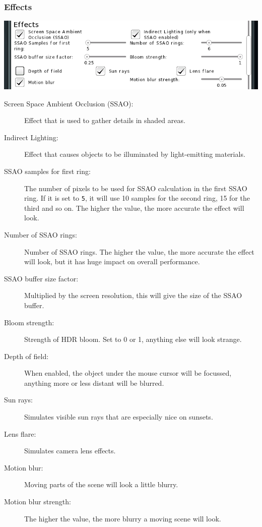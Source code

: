 \documentclass[a4paper]{article}
\newcommand{\cvalue}[1]{\texttt{#1}}
\begin{document}
\subsubsection{Effects}
\includegraphics[width=140mm]{./images/settings-effects.png}
\begin{description}
  \item[Screen Space Ambient Occlusion (SSAO):] Effect that is used to gather details in shaded areas.
  \item[Indirect Lighting:] Effect that causes objects to be illuminated by light-emitting materials.
  \item[SSAO samples for first ring:] The number of pixels to be used for SSAO calculation in the first SSAO ring. If it is set to \cvalue{5}, it will use 10 samples for the second ring, 15 for the third and so on. The higher the value, the more accurate the effect will look.
  \item[Number of SSAO rings:] Number of SSAO rings. The higher the value, the more accurate the effect will look, but it has huge impact on overall performance.
  \item[SSAO buffer size factor:] Multiplied by the screen resolution, this will give the size of the SSAO buffer.
  \item[Bloom strength:] Strength of HDR bloom. Set to 0 or 1, anything else will look strange.
  \item[Depth of field:] When enabled, the object under the mouse cursor will be focussed, anything more or less distant will be blurred.
  \item[Sun rays:] Simulates visible sun rays that are especially nice on sunsets.
  \item[Lens flare:] Simulates camera lens effects.
  \item[Motion blur:] Moving parts of the scene will look a little blurry.
  \item[Motion blur strength:] The higher the value, the more blurry a moving scene will look.
\end{description}
\end{document}
